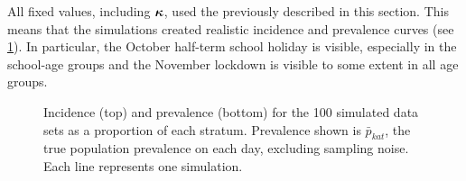 \documentclass[thesis.tex]{subfiles}
\begin{document}
All fixed values, including $\bm{\kappa}$, used the previously described in this section.
This means that the simulations created realistic incidence and prevalence curves (see \cref{SEIR:fig:sim-data}).
In particular, the October half-term school holiday is visible, especially in the school-age groups and the November lockdown is visible to some extent in all age groups.
\begin{figure}
    \vspace{-3cm}
    \caption[Simulated data]{%
        Incidence (top) and prevalence (bottom) for the 100 simulated data sets as a proportion of each stratum.
        Prevalence shown is $\bar{p}_{kat}$, the true population prevalence on each day, excluding sampling noise.
        Each line represents one simulation.
    }
    \label{SEIR:fig:sim-data}
\end{figure}
\end{document}
